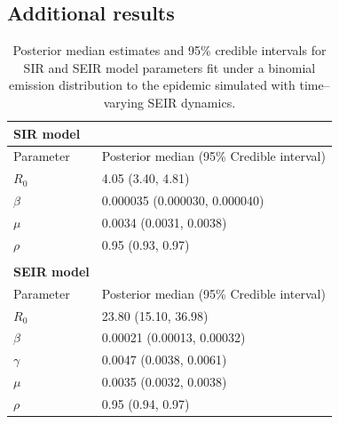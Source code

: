\subsection{Additional results}
\label{subsec:bda_misspec_additional_results}
\begin{table}[htbp]
	\centering
	\begin{tabular}{ll}
		\textbf{SIR model} & \\
		\hline\hline
		Parameter & Posterior median (95\% Credible interval) \\ 
		\hline
		$ R_0 $ & 4.05 (3.40, 4.81) \\ 
		$\beta $ & 0.000035 (0.000030, 0.000040) \\ 
		$ \mu $ & 0.0034 (0.0031, 0.0038) \\ 
		$ \rho $ & 0.95 (0.93, 0.97) \\
		\hline & \\
		\textbf{SEIR model} & \\
		\hline\hline
		Parameter & Posterior median (95\% Credible interval) \\ 
		\hline 
		$ R_0 $ & 23.80 (15.10, 36.98) \\ 
		$ \beta $ & 0.00021 (0.00013, 0.00032) \\ 
		$ \gamma $ & 0.0047 (0.0038, 0.0061) \\ 
		$ \mu $ & 0.0035 (0.0032, 0.0038) \\ 
		$ \rho $ & 0.95 (0.94, 0.97) \\ 
		\hline
	\end{tabular}
	\caption{Posterior median estimates and 95\% credible intervals for SIR and SEIR model parameters fit under a binomial emission distribution to the epidemic simulated with time--varying SEIR dynamics.}
\end{table}

